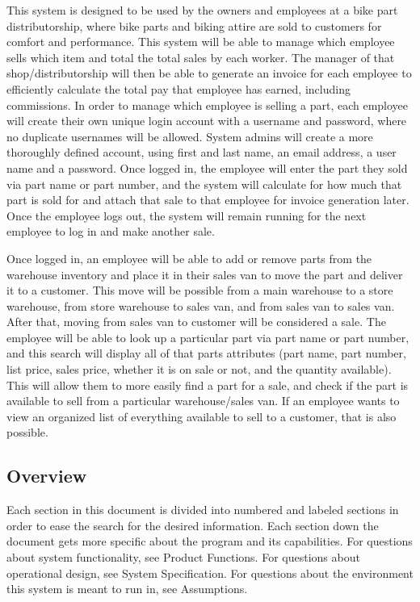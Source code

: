 \documentclass{report}
\begin{document}
This system is designed to be used by the owners and employees at a bike part distributorship, where bike parts and biking attire are sold to customers for comfort and performance. This system will be able to manage which employee sells which item and total the total sales by each worker. The manager of that shop/distributorship will then be able to generate an invoice for each employee to efficiently calculate the total pay that employee has earned, including commissions. In order to manage which employee is selling a part, each employee will create their own unique login account with a username and password, where no duplicate usernames will be allowed. System admins will create a more thoroughly defined account, using first and last name, an email address, a user name and a password. Once logged in, the employee will enter the part they sold via part name or part number, and the system will calculate for how much that part is sold for and attach that sale to that employee for invoice generation later. Once the employee logs out, the system will remain running for the next employee to log in and make another sale.\par
Once logged in, an employee will be able to add or remove parts from the warehouse inventory and place it in their sales van to move the part and deliver it to a customer. This move will be possible from a main warehouse to a store warehouse, from store warehouse to sales van, and from sales van to sales van. After that, moving from sales van to customer will be considered a sale. The employee will be able to look up a particular part via part name or part number, and this search will display all of that parts attributes (part name, part number, list price, sales price, whether it is on sale or not, and the quantity available). This will allow them to more easily find a part for a sale, and check if the part is available to sell from a particular warehouse/sales van. If an employee wants to view an organized list of everything available to sell to a customer, that is also possible.\par

\subsection{Overview}

Each section in this document is divided into numbered and labeled sections in order to ease the search for the desired information. Each section down the document gets more specific about the program and its capabilities. For questions about system functionality, see Product Functions. For questions about operational design, see System Specification. For questions about the environment this system is meant to run in, see Assumptions.\par
\end{document}
